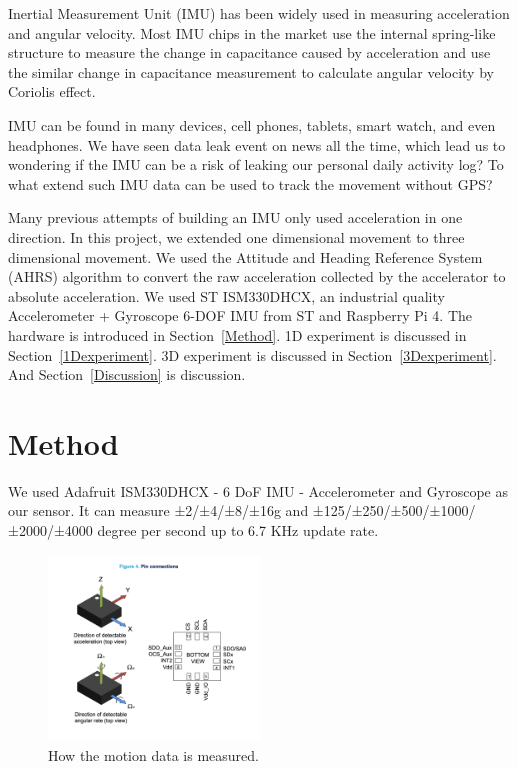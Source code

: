\documentclass[%
 reprint,
 amsmath,amssymb,
 aps,
]{revtex4-2}
\begin{document}
Inertial Measurement Unit (IMU) has been widely used in measuring acceleration and angular velocity. Most IMU chips in the market use the internal spring-like structure to measure the change in capacitance caused by acceleration and use the similar change in capacitance measurement to calculate angular velocity by Coriolis effect.\cite{structure}

IMU can be found in many devices, cell phones, tablets, smart watch, and even headphones. We have seen data leak event\cite{news} on news all the time, which lead us to wondering if the IMU can be a risk of leaking our personal daily activity log? To what extend such IMU data can be used to track the movement without GPS?

Many previous attempts of building an IMU only used acceleration in one direction.\cite{rpimu} In this project, we extended one dimensional movement to three dimensional movement. We used the Attitude and Heading Reference System (AHRS) algorithm to convert the raw acceleration collected by the accelerator to absolute acceleration. We used ST ISM330DHCX, an industrial quality Accelerometer + Gyroscope 6-DOF IMU from ST and Raspberry Pi 4.   
The hardware is introduced in Section~\ref{Method}. 1D experiment is discussed in Section~\ref{1Dexperiment}. 3D experiment is discussed in Section~\ref{3Dexperiment}. And Section~\ref{Discussion} is discussion.


\section{\label{Method}Method}
We used Adafruit ISM330DHCX\cite{ism} - 6 DoF IMU - Accelerometer and Gyroscope as our sensor. It can measure ±2/±4/±8/±16g and ±125/±250/±500/±1000/±2000/±4000 degree per second up to 6.7 KHz update rate.
\begin{figure}[H]
\includegraphics[width=0.5\textwidth]{sensor.png}
\caption{\label{superman}How the motion data is measured.}
\end{figure}
\end{document}

